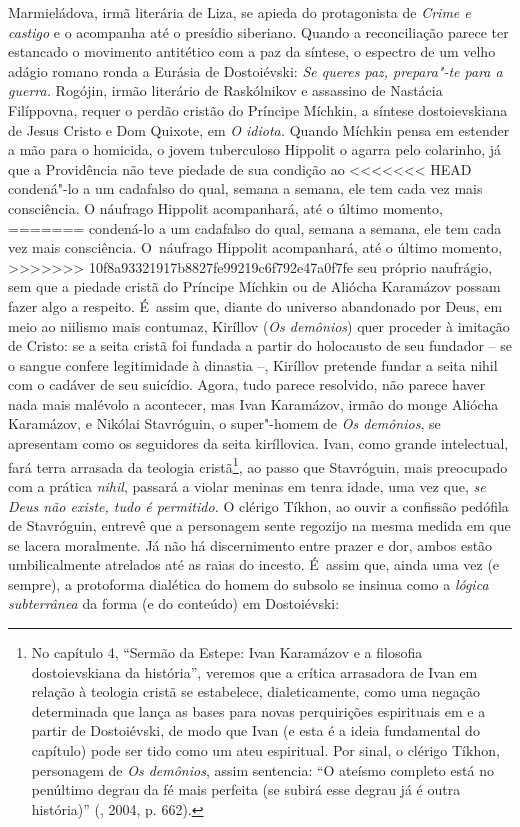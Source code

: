 {Marmieládova, irmã literária de Liza, se apieda do protagonista de
\emph{Crime e castigo} e o acompanha até o presídio siberiano. Quando a
reconciliação parece ter estancado o movimento antitético com a paz da
síntese, o espectro de um velho adágio romano ronda a Eurásia de
Dostoiévski: \emph{Se queres paz, prepara"-te para a guerra.} Rogójin,
irmão literário de Raskólnikov e assassino de Nastácia Filíppovna,
requer o perdão cristão do Príncipe Míchkin, a síntese dostoievskiana de
Jesus Cristo e Dom Quixote, em \emph{O idiota.} Quando Míchkin pensa em
estender a mão para o homicida, o jovem tuberculoso Hippolit o agarra
pelo colarinho, já que a Providência não teve piedade de sua condição ao
<<<<<<< HEAD
condená"-lo a um cadafalso do qual, semana a semana, ele tem cada vez
mais consciência. O náufrago Hippolit acompanhará, até o último momento,
=======
condená-lo a um cadafalso do qual, semana a semana, ele tem cada vez
mais consciência. O~náufrago Hippolit acompanhará, até o último momento,
>>>>>>> 10f8a93321917b8827fe99219c6f792e47a0f7fe
seu próprio naufrágio, sem que a piedade cristã do Príncipe Míchkin ou
de Aliócha Karamázov possam fazer algo a respeito. É~assim que, diante
do universo abandonado por Deus, em meio ao niilismo mais contumaz,
Kiríllov (\emph{Os demônios}) quer proceder à imitação de Cristo: se a
seita cristã foi fundada a partir do holocausto de seu fundador -- se o
sangue confere legitimidade à dinastia --, Kiríllov pretende fundar a
seita nihil com o cadáver de seu suicídio. Agora, tudo parece resolvido,
não parece haver nada mais malévolo a acontecer, mas Ivan Karamázov,
irmão do monge Aliócha Karamázov, e Nikólai Stavróguin, o super"-homem de
\emph{Os demônios}, se apresentam como os seguidores da seita
kiríllovica. Ivan, como grande intelectual, fará terra arrasada da
teologia cristã\footnote{No capítulo 4, ``Sermão da Estepe: Ivan
  Karamázov e a filosofia dostoievskiana da história'', veremos que a
  crítica arrasadora de Ivan em relação à teologia cristã se estabelece,
  dialeticamente, como uma negação determinada que lança as bases para
  novas perquirições espirituais em e a partir de Dostoiévski, de modo
  que Ivan (e esta é a ideia fundamental do capítulo) pode ser tido como
  um ateu espiritual. Por sinal, o clérigo Tíkhon, personagem de
  \emph{Os demônios}, assim sentencia: ``O ateísmo completo está no
  penúltimo degrau da fé mais perfeita (se subirá esse degrau já é outra
  história)'' (, 2004, p. 662).}, ao passo que Stavróguin,
mais preocupado com a prática \emph{nihil}, passará a violar meninas em
tenra idade, uma vez que, \emph{se Deus não existe, tudo é permitido.} O
clérigo Tíkhon, ao ouvir a confissão pedófila de Stavróguin, entrevê que
a personagem sente regozijo na mesma medida em que se lacera moralmente.
Já não há discernimento entre prazer e dor, ambos estão umbilicalmente
atrelados até as raias do incesto. É~assim que, ainda uma vez (e
sempre), a protoforma dialética do homem do subsolo se insinua como a
\emph{lógica subterrânea} da forma (e do conteúdo) em Dostoiévski:

}
